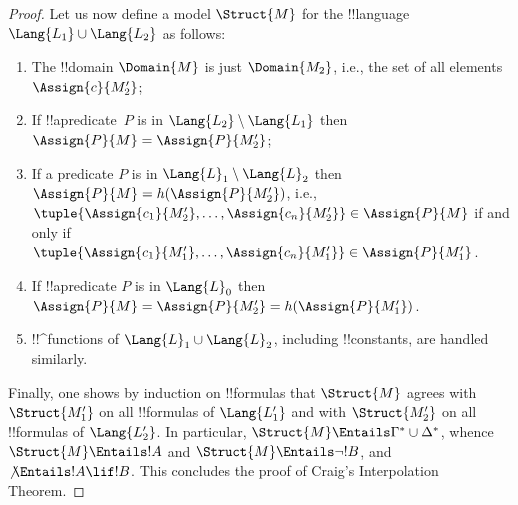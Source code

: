 \documentclass[../../../include/open-logic-section]{subfiles}
\begin{document}
\begin{proof}
Let us now define a model $\Struct{M}$ for the !!{language}
$\Lang{L_1} \cup \Lang{L_2}$ as follows:
\begin{enumerate}
\item The !!{domain} $\Domain{M}$ is just $\Domain{M_2}$, i.e., the
  set of all elements $\Assign{c}{M'_2}$; 
\item If !!a{predicate}~$P$ is in $\Lang{L_2} \setminus
  \Lang{L_1}$ then $\Assign{P}{M} = \Assign{P}{M'_2}$;
\item If a predicate $P$ is in $\Lang{L}_1\setminus \Lang{L}_2$ then
  $\Assign{P}{M} = h(\Assign{P}{M'_2})$, i.e.,
  $\tuple{\Assign{c_1}{M'_2}, \dots, \Assign{c_n}{M'_2}} \in
  \Assign{P}{M}$ if and only if $\tuple{\Assign{c_1}{M'_1}, \dots,
  \Assign{c_n}{M'_1}} \in \Assign{P}{M'_1}$.
\item If !!a{predicate} $P$ is in $\Lang{L}_0$ then $\Assign{P}{M} =
  \Assign{P}{M'_2} = h(\Assign{P}{M'_1})$. 
\item !!^{function}s of $\Lang{L}_1 \cup \Lang{L}_2$, including
  !!{constant}s, are handled similarly.
\end{enumerate}

Finally, one shows by induction on !!{formula}s that $\Struct{M}$ agrees
with $\Struct{M'_1}$ on all !!{formula}s of $\Lang{L'_1}$ and with
$\Struct{M'_2}$ on all !!{formula}s of $\Lang{L'_2}$. In particular,
$\Struct{M} \Entails \Gamma^* \cup \Delta^*$, whence $\Struct{M}
\Entails !A$ and $\Struct{M} \Entails \lnot!B$, and
$\not\Entails !A \lif !B$. This concludes the proof of
Craig's Interpolation Theorem.
\end{proof}
\end{document}
